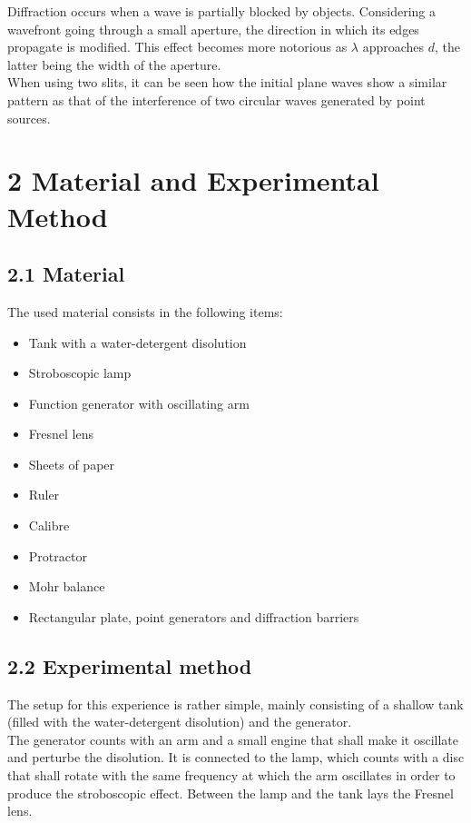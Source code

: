 \documentclass[a4paper, 12pt]{article}
\begin{document}
		Diffraction occurs when a wave is partially blocked by objects. Considering a wavefront going through a small aperture, the direction in which its edges propagate is modified. This effect becomes more notorious as $\lambda$ approaches $d$, the latter being the width of the aperture. \\
		
		When using two slits, it can be seen how the initial plane waves show a similar pattern as that of the interference of two circular waves generated by point sources. %
	\section{2 Material and Experimental Method}
	\subsection{2.1 Material}
	The used material consists in the following items:
	\begin{itemize}
		\item Tank with a water-detergent disolution
		\item Stroboscopic lamp
		\item Function generator with oscillating arm
		\item Fresnel lens
		\item Sheets of paper
		\item Ruler
		\item Calibre
		\item Protractor
		\item Mohr balance
		\item Rectangular plate, point generators and diffraction barriers
	
	\end{itemize}
	
	\subsection{2.2 Experimental method}
	The setup for this experience is rather simple, mainly consisting of a shallow tank (filled with the water-detergent disolution) and the generator.\\
	
	The generator counts with an arm and a small engine that shall make it oscillate and perturbe the disolution. It is connected to the lamp, which counts with a disc that shall rotate with the same frequency at which the arm oscillates in order to produce the stroboscopic effect. Between the lamp and the tank lays the Fresnel lens. \\
	
\end{document}

